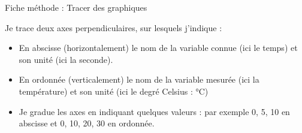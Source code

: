 \documentclass[10pt]{article}
\newcommand{\titre}{Fiche méthode : Tracer des graphiques} %
\begin{document}
\begin{titlebox}{\titre}
    \vspace{5pt}

    \begin{minipage}[c]{0.5\textwidth}
        \centering
        Je trace deux axes perpendiculaires, sur lesquels j’indique :
    \begin{itemize}
        \item En abscisse (horizontalement) le nom de la variable connue (ici le temps) et son unité (ici la seconde).
        \item En ordonnée (verticalement) le nom de la variable mesurée (ici la température) et son unité (ici le degré Celsius : °C)
        \item Je gradue les axes en indiquant quelques valeurs :
        par exemple 0, 5, 10 en abscisse et 0, 10, 20, 30 en ordonnée.
    \end{itemize}
    \vspace{-7pt}
    \end{minipage}
    \hspace{20pt}
    \begin{minipage}[c]{0.5\textwidth}
        \begin{center}        
        \end{center}
    \end{minipage}
    \vspace{0pt}
        

\end{titlebox}
\end{document}
